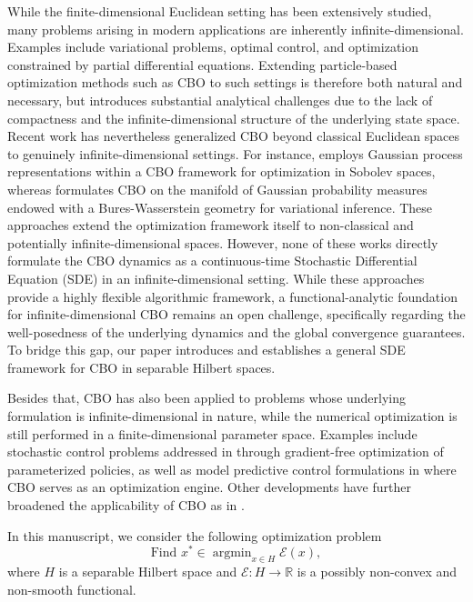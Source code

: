 \documentclass[12pt]{amsart}
\DeclareMathOperator*{\argmin}{argmin}
\numberwithin{equation}{section}
\begin{document}
While the finite-dimensional Euclidean setting has been extensively studied, many problems arising in modern applications are inherently infinite-dimensional. Examples include variational problems, optimal control, and optimization constrained by partial differential equations. Extending particle-based optimization methods such as CBO to such settings is therefore both natural and necessary, but introduces substantial analytical challenges due to the lack of compactness and the infinite-dimensional structure of the underlying state space. Recent work has nevertheless generalized CBO beyond classical Euclidean spaces to genuinely infinite-dimensional settings. For instance, \cite{khatab2026consensus} employs Gaussian process representations within a CBO framework for optimization in Sobolev spaces, whereas \cite{borghi2026variational} formulates CBO on the manifold of Gaussian probability measures endowed with a Bures-Wasserstein geometry for variational inference. These approaches extend the optimization framework itself to non-classical and potentially infinite-dimensional spaces. However, none of these works directly formulate the CBO dynamics as a continuous-time Stochastic Differential Equation (SDE) in an infinite-dimensional setting. While these approaches provide a highly flexible algorithmic framework, a functional-analytic foundation for infinite-dimensional CBO remains an open challenge, specifically regarding the well-posedness of the underlying dynamics and the global convergence guarantees. To bridge this gap, our paper introduces and establishes a general SDE framework for CBO in separable Hilbert spaces.

Besides that, CBO has also been applied to problems whose underlying formulation is infinite-dimensional in nature, while the numerical optimization is still performed in a finite-dimensional parameter space. Examples include stochastic control problems addressed in \cite{lyu2025consensus} through gradient-free optimization of parameterized policies, as well as model predictive control formulations in \cite{borghi2025model} where CBO serves as an optimization engine. Other developments have further broadened the applicability of CBO as in \cite{beddrich2026constrained}.




In this manuscript, we consider the following optimization problem
\begin{equation*}
    \text{Find } x^* \in \argmin_{x \in H} \mathscr{E}(x),
\end{equation*}
where $H$ is a separable Hilbert space and $\mathscr{E}:H\to\mathbb{R}$ is a possibly non-convex and non-smooth functional.
\end{document}
